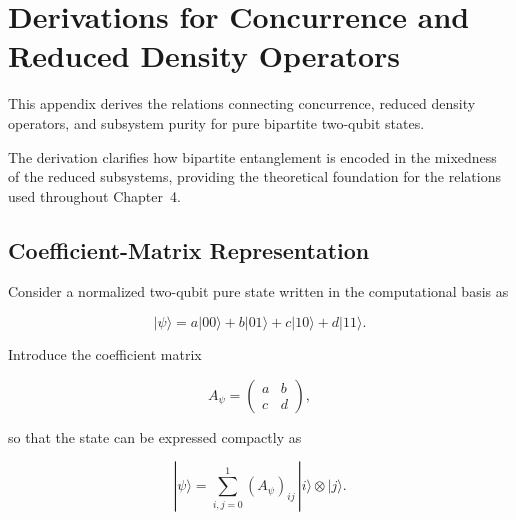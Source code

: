 
\section{Derivations for Concurrence and Reduced Density Operators}
\label{app:concurrence_reduced_density_operators}

This appendix derives the relations connecting concurrence, reduced density operators, and subsystem purity for pure bipartite two-qubit states.

\medskip

The derivation clarifies how bipartite entanglement is encoded in the mixedness of the reduced subsystems, providing the theoretical foundation for the relations used throughout Chapter~4.


\subsection*{Coefficient-Matrix Representation}

Consider a normalized two-qubit pure state written in the computational basis as

\begin{equation}
|\psi\rangle
=
a|00\rangle
+
b|01\rangle
+
c|10\rangle
+
d|11\rangle.
\label{eq:generic_two_qubit_state}
\end{equation}

Introduce the coefficient matrix

\begin{equation}
A_\psi
=
\begin{pmatrix}
a & b\\
c & d
\end{pmatrix},
\label{eq:coefficient_matrix_definition}
\end{equation}

so that the state can be expressed compactly as

\begin{equation}
|\psi\rangle
=
\sum_{i,j=0}^{1}
(A_\psi)_{ij}
\,|i\rangle \otimes |j\rangle.
\label{eq:state_coefficient_matrix_expansion}
\end{equation}

